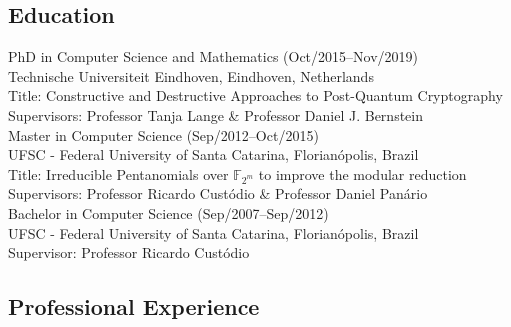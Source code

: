
\subsection*{Education}
\noindent 
PhD in Computer Science and Mathematics (Oct/2015--Nov/2019)~\\
Technische Universiteit Eindhoven, Eindhoven, Netherlands~\\
\noindent 
Title: Constructive and Destructive Approaches to Post-Quantum Cryptography~\\
Supervisors: Professor Tanja Lange \& Professor Daniel J. Bernstein~\\

 \noindent 
Master in Computer Science (Sep/2012--Oct/2015) ~\\
UFSC - Federal University of Santa Catarina, Florianópolis, Brazil~\\
\noindent 
Title: Irreducible Pentanomials over $\mathbb{F}_{2^m}$ to improve the modular reduction~\\
Supervisors: Professor Ricardo Custódio \& Professor Daniel Panário~\\

 \noindent 
Bachelor in Computer Science (Sep/2007--Sep/2012) ~\\
UFSC - Federal University of Santa Catarina, Florianópolis, Brazil~\\
Supervisor: Professor Ricardo Custódio

\subsection*{Professional Experience}


